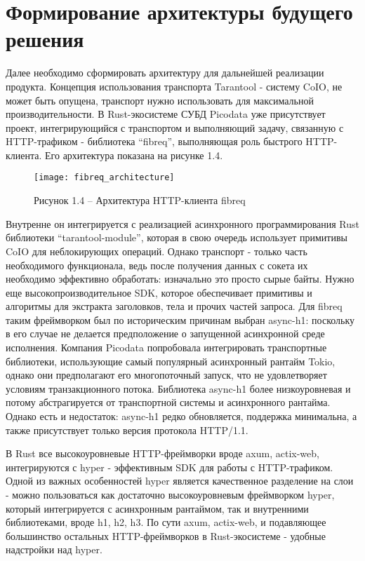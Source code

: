 \documentclass[times,numbers=noenddot]{itmo-student-thesis}
\begin{document}
\section{Формирование архитектуры будущего решения}\label{sec:new_architecture}

Далее необходимо сформировать архитектуру для дальнейшей реализации продукта.
Концепция использования транспорта Tarantool - систему CoIO, не может быть опущена, транспорт нужно использовать для максимальной производительности.
В Rust-экосистеме СУБД Picodata уже присутствует проект, интегрирующийся с транспортом и выполняющий задачу, связанную с HTTP-трафиком - библиотека “fibreq”, выполняющая роль быстрого HTTP-клиента.
Его архитектура показана на рисунке 1.4.

\begin{figure}[!h]
	\caption*{Рисунок 1.4 -- Архитектура HTTP-клиента fibreq}\label{fig4}
	\centering
	\texttt{[image: fibreq\_architecture]}
\end{figure}

Внутренне он интегрируется с реализацией асинхронного программирования Rust библиотеки “tarantool-module”, которая в свою очередь использует примитивы CoIO для неблокирующих операций.
Однако транспорт - только часть необходимого функционала, ведь после получения данных с сокета их необходимо эффективно обработать: изначально это просто сырые байты.
Нужно еще высокопроизводительное SDK, которое обеспечивает примитивы и алгоритмы для экстракта заголовков, тела и прочих частей запроса.
Для fibreq таким фреймворком был по историческим причинам выбран async-h1: поскольку в его случае не делается предположение о запущенной асинхронной среде исполнения.
Компания Picodata попробовала интегрировать транспортные библиотеки, использующие самый популярный асинхронный рантайм Tokio, однако они предполагают его многопоточный запуск, что не удовлетворяет условиям транзакционного потока.
Библиотека async-h1 более низкоуровневая и потому абстрагируется от транспортной системы и асинхронного рантайма.
Однако есть и недостаток: async-h1 редко обновляется, поддержка минимальна, а также присутствует только версия протокола HTTP/1.1.

В Rust все высокоуровневые HTTP-фреймворки вроде axum, actix-web, интегрируются с hyper - эффективным SDK для работы с HTTP-трафиком.
Одной из важных особенностей hyper является качественное разделение на слои - можно пользоваться как достаточно высокоуровневым фреймворком hyper, который интегрируется с асинхронным рантаймом, так и внутренними библиотеками, вроде h1, h2, h3.
По сути axum, actix-web, и подавляющее большинство остальных HTTP-фреймворков в Rust-экосистеме - удобные надстройки над hyper.
\end{document}
